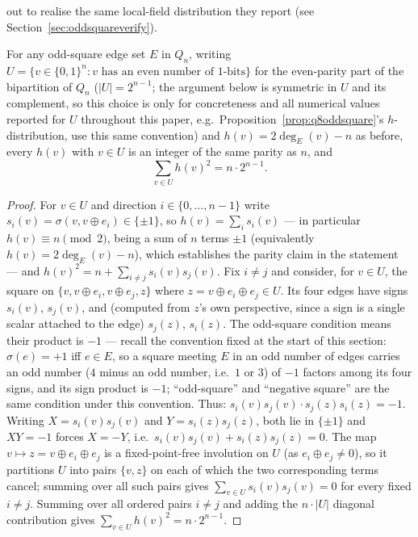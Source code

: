 \documentclass[12pt]{article}
\begin{document}
out to realise the same local-field distribution they report (see
Section~\ref{sec:oddsquareverify}).

\begin{lemma}\label{lem:fieldbound}
For any odd-square edge set $E$ in $Q_n$, writing $U=\{v\in\{0,1\}^n:
v \text{ has an even number of } 1\text{-bits}\}$ for the
even-parity part of
the bipartition of $Q_n$ ($|U|=2^{n-1}$; the argument below is
symmetric in $U$ and its complement, so this choice is only for
concreteness and all numerical values reported for $U$ throughout this
paper, e.g.\ Proposition~\ref{prop:q8oddsquare}'s $h$-distribution,
use this same convention) and $h(v)=2\deg_E(v)-n$ as before, every
$h(v)$ with $v\in U$ is an integer of the same parity as $n$, and
\[
\sum_{v\in U}h(v)^2=n\cdot2^{n-1}.
\]
\end{lemma}
\begin{proof}
For $v\in U$ and direction $i\in\{0,\ldots,n-1\}$ write
$s_i(v)=\sigma(v,v\oplus e_i)\in\{\pm1\}$, so $h(v)=\sum_i s_i(v)$ ---
in particular $h(v)\equiv n\pmod2$, being a sum of $n$ terms $\pm1$
(equivalently $h(v)=2\deg_E(v)-n$), which establishes the parity claim
in the statement --- and
$h(v)^2=n+\sum_{i\ne j}s_i(v)s_j(v)$. Fix $i\ne j$ and consider, for
$v\in U$, the square on $\{v,v\oplus e_i,v\oplus e_j,z\}$ where
$z=v\oplus e_i\oplus e_j\in U$. Its four edges have signs $s_i(v)$,
$s_j(v)$, and (computed from $z$'s own perspective, since a sign is a
single scalar attached to the edge) $s_j(z)$, $s_i(z)$. The odd-square
condition means their product is $-1$ --- recall the convention fixed at
the start of this section: $\sigma(e)=+1$ iff $e\in E$, so a square
meeting $E$ in an odd number of edges carries an odd number ($4$ minus an
odd number, i.e.\ $1$ or $3$) of $-1$ factors among its four signs, and
its sign product is $-1$; ``odd-square'' and ``negative square'' are the
same condition under this convention. Thus:
$s_i(v)s_j(v)\cdot s_j(z)s_i(z)=-1$. Writing $X=s_i(v)s_j(v)$ and
$Y=s_i(z)s_j(z)$, both lie in $\{\pm1\}$ and $XY=-1$ forces $X=-Y$, i.e.\
$s_i(v)s_j(v)+s_i(z)s_j(z)=0$. The map $v\mapsto z=v\oplus e_i\oplus e_j$
is a fixed-point-free involution on $U$ (as $e_i\oplus e_j\ne0$), so it
partitions $U$ into pairs $\{v,z\}$ on each of which the two
corresponding terms cancel; summing over all such pairs gives
$\sum_{v\in U}s_i(v)s_j(v)=0$ for every fixed $i\ne j$. Summing over all
ordered pairs $i\ne j$ and adding the $n\cdot|U|$ diagonal contribution
gives $\sum_{v\in U}h(v)^2=n\cdot2^{n-1}$.
\end{proof}
\end{document}
